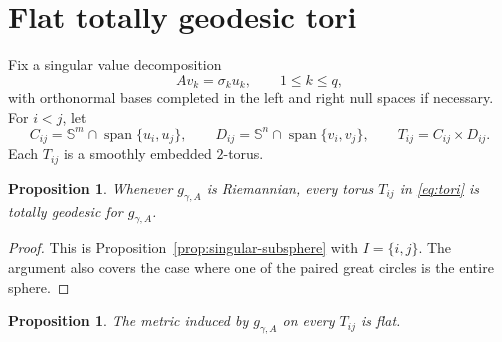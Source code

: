 \documentclass[11pt]{amsart}
\newtheorem{proposition}[theorem]{Proposition}
\theoremstyle{definition}
\theoremstyle{remark}
\DeclareMathOperator{\spanop}{span}
\newcommand{\Sph}{\mathbb S}
\begin{document}
\section{Flat totally geodesic tori}\label{sec:tori}

Fix a singular value decomposition
\begin{equation}\label{eq:svd}
 Av_k=\sigma_k u_k,
 \qquad 1\leq k\leq q,
\end{equation}
with orthonormal bases completed in the left and right null spaces if
necessary.  For $i<j$, let
\begin{equation}\label{eq:tori}
 C_{ij}=\Sph^m\cap\spanop\{u_i,u_j\},\qquad
 D_{ij}=\Sph^n\cap\spanop\{v_i,v_j\},\qquad
 T_{ij}=C_{ij}\times D_{ij}.
\end{equation}
Each $T_{ij}$ is a smoothly embedded $2$-torus.

\begin{proposition}\label{prop:tg}
Whenever $g_{\gamma,A}$ is Riemannian, every torus $T_{ij}$ in
\eqref{eq:tori} is totally geodesic for $g_{\gamma,A}$.
\end{proposition}

\begin{proof}
This is Proposition~\ref{prop:singular-subsphere} with
$I=\{i,j\}$.  The argument also covers the case where one of the
paired great circles is the entire sphere.
\end{proof}

\begin{proposition}\label{prop:flat}
The metric induced by $g_{\gamma,A}$ on every $T_{ij}$ is flat.
\end{proposition}
\end{document}
